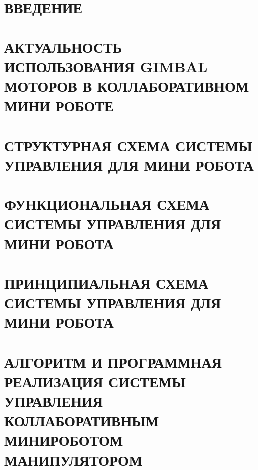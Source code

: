 
\section*{ВВЕДЕНИЕ}


\section{АКТУАЛЬНОСТЬ ИСПОЛЬЗОВАНИЯ GIMBAL МОТОРОВ В КОЛЛАБОРАТИВНОМ МИНИ РОБОТЕ}


\section{СТРУКТУРНАЯ СХЕМА СИСТЕМЫ УПРАВЛЕНИЯ ДЛЯ МИНИ РОБОТА}


\section{ФУНКЦИОНАЛЬНАЯ СХЕМА СИСТЕМЫ УПРАВЛЕНИЯ ДЛЯ МИНИ РОБОТА}


\section{ПРИНЦИПИАЛЬНАЯ СХЕМА СИСТЕМЫ УПРАВЛЕНИЯ ДЛЯ МИНИ РОБОТА}

\section{АЛГОРИТМ И ПРОГРАММНАЯ РЕАЛИЗАЦИЯ СИСТЕМЫ УПРАВЛЕНИЯ КОЛЛАБОРАТИВНЫМ МИНИРОБОТОМ МАНИПУЛЯТОРОМ}








% 
